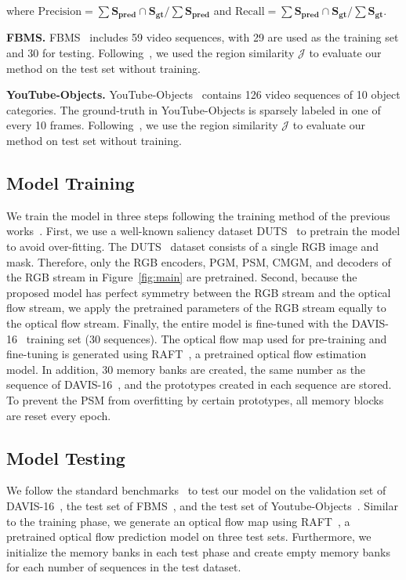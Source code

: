 \documentclass[10pt,twocolumn,letterpaper]{article}
\begin{document}
\noindent
where $\textrm{Precision} = \sum{\mathbf{S_{pred}} \cap \mathbf{S_{gt}}} / \sum{\mathbf{S_{pred}}}$ and $\textrm{Recall} = \sum{\mathbf{S_{pred}} \cap \mathbf{S_{gt}}} / \sum{\mathbf{S_{gt}}}$.

\noindent
\textbf{FBMS.} FBMS~\cite{ochs2013segmentation} includes 59 video sequences, with 29 are used as the training set and 30 for testing. Following~\cite{yang2019anchor, lu2019see, zhou2020motion}, we used the region similarity $\mathcal{J}$ to evaluate our method on the test set without training.

\noindent
\textbf{YouTube-Objects.} YouTube-Objects~\cite{prest2012learning} contains 126 video sequences of 10 object categories. The ground-truth in YouTube-Objects is sparsely labeled in one of every 10 frames. Following~\cite{yang2019anchor, lu2019see, zhou2020motion}, we use the region similarity $\mathcal{J}$ to evaluate our method on test set without training.

\subsection{Model Training}
We train the model in three steps following the training method of the previous works~\cite{ji2021full, ren2021reciprocal, liu2021f2net, lu2019see}. First, we use a well-known saliency dataset DUTS~\cite{wang2017learning} to pretrain the model to avoid over-fitting. The DUTS~\cite{wang2017learning} dataset consists of a single RGB image and mask. Therefore, only the RGB encoders, PGM, PSM, CMGM, and decoders of the RGB stream in Figure~\ref{fig:main} are pretrained. Second, because the proposed model has perfect symmetry between the RGB stream and the optical flow stream, we apply the pretrained parameters of the RGB stream equally to the optical flow stream. Finally, the entire model is fine-tuned with the DAVIS-16~\cite{perazzi2016benchmark} training set (30 sequences). The optical flow map used for pre-training and fine-tuning is generated using RAFT~\cite{teed2020raft}, a pretrained optical flow estimation model. In addition, 30 memory banks are created, the same number as the sequence of DAVIS-16~\cite{perazzi2016benchmark}, and the prototypes created in each sequence are stored. To prevent the PSM from overfitting by certain prototypes, all memory blocks are reset every epoch.

\subsection{Model Testing}
We follow the standard benchmarks~\cite{fan2019shifting, perazzi2016benchmark} to test our model on the validation set of DAVIS-16~\cite{perazzi2016benchmark}, the test set of FBMS~\cite{ochs2013segmentation}, and the test set of Youtube-Objects~\cite{prest2012learning}. Similar to the training phase, we generate an optical flow map using RAFT~\cite{teed2020raft}, a pretrained optical flow prediction model on three test sets. Furthermore, we initialize the memory banks in each test phase and create empty memory banks for each number of sequences in the test dataset.
\end{document}
